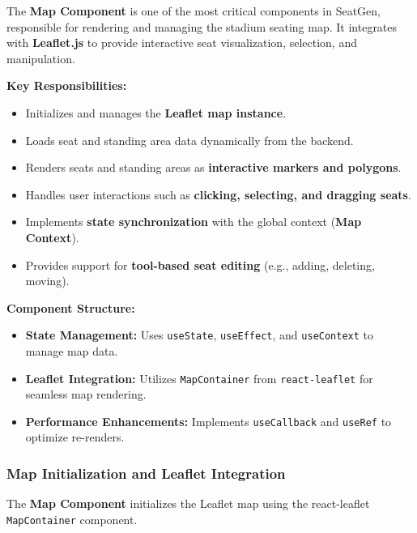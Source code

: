 The \textbf{Map Component} is one of the most critical components in SeatGen, responsible for rendering and managing the stadium seating map. It integrates with \textbf{Leaflet.js} to provide interactive seat visualization, selection, and manipulation.

\textbf{Key Responsibilities:}
\begin{itemize}
    \item Initializes and manages the \textbf{Leaflet map instance}.
    \item Loads seat and standing area data dynamically from the backend.
    \item Renders seats and standing areas as \textbf{interactive markers and polygons}.
    \item Handles user interactions such as \textbf{clicking, selecting, and dragging seats}.
    \item Implements \textbf{state synchronization} with the global context (\textbf{Map Context}).
    \item Provides support for \textbf{tool-based seat editing} (e.g., adding, deleting, moving).
\end{itemize}

\textbf{Component Structure:}
\begin{itemize}
    \item \textbf{State Management:} Uses \texttt{useState}, \texttt{useEffect}, and \texttt{useContext} to manage map data.
    \item \textbf{Leaflet Integration:} Utilizes \texttt{MapContainer} from \texttt{react-leaflet} for seamless map rendering.
    \item \textbf{Performance Enhancements:} Implements \texttt{useCallback} and \texttt{useRef} to optimize re-renders.
\end{itemize}

\subsubsection{Map Initialization and Leaflet Integration}

The \textbf{Map Component} initializes the Leaflet map using the react-leaflet \texttt{MapContainer} component.

